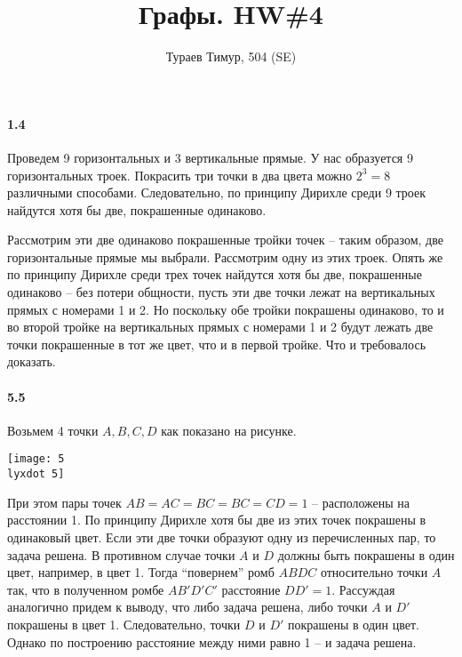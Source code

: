 \documentclass[russian]{article}
\newcommand{\lyxdot}{.}
\begin{document}
\title{Графы. HW\#4}


\author{Тураев Тимур, 504 (SE)}

\maketitle

\paragraph{1.4}

Проведем 9 горизонтальных и 3 вертикальные прямые. У нас образуется
9 горизонтальных троек. Покрасить три точки в два цвета можно $2^{3}=8$
различными способами. Следовательно, по принципу Дирихле среди 9 троек
найдутся хотя бы две, покрашенные одинаково.

Рассмотрим эти две одинаково покрашенные тройки точек -- таким образом,
две горизонтальные прямые мы выбрали. Рассмотрим одну из этих троек.
Опять же по принципу Дирихле среди трех точек найдутся хотя бы две,
покрашенные одинаково -- без потери общности, пусть эти две точки
лежат на вертикальных прямых с номерами 1 и 2. Но поскольку обе тройки
покрашены одинаково, то и во второй тройке на вертикальных прямых
с номерами 1 и 2 будут лежать две точки покрашенные в тот же цвет,
что и в первой тройке. Что и требовалось доказать.


\paragraph{5.5}

Возьмем 4 точки $A,B,C,D$ как показано на рисунке.

\begin{center}
\texttt{[image: 5\\lyxdot 5]}
\par\end{center}

При этом пары точек $AB=AC=BC=BC=CD=1$ -- расположены на расстоянии
1. По принципу Дирихле хотя бы две из этих точек покрашены в одинаковый
цвет. Если эти две точки образуют одну из перечисленных пар, то задача
решена. В противном случае точки $A$ и $D$ должны быть покрашены
в один цвет, например, в цвет 1. Тогда {}``повернем'' ромб $ABDC$
относительно точки $A$ так, что в полученном ромбе $AB'D'C'$ расстояние
$DD'=1$. Рассуждая аналогично придем к выводу, что либо задача решена,
либо точки $A$ и $D'$ покрашены в цвет 1. Следовательно, точки $D$
и $D'$ покрашены в один цвет. Однако по построению расстояние между
ними равно 1 -- и задача решена.
\end{document}
